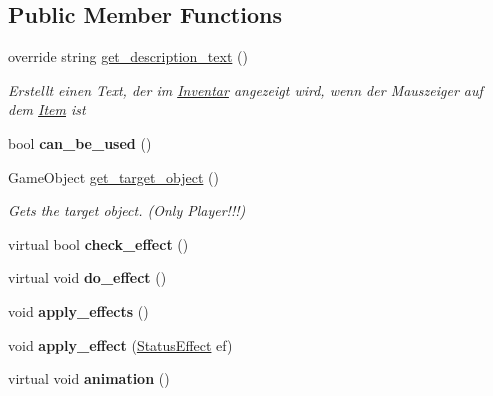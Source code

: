 \subsection*{Public Member Functions}
\begin{DoxyCompactItemize}
\item 
override string \hyperlink{class_spaceship_module_a787019cbebc400d17dc7233ca315c6da}{get\+\_\+description\+\_\+text} ()
\begin{DoxyCompactList}\small\item\em Erstellt einen Text, der im \hyperlink{class_inventar}{Inventar} angezeigt wird, wenn der Mauszeiger auf dem \hyperlink{class_item}{Item} ist \end{DoxyCompactList}\item 
\mbox{\label{class_spaceship_module_ad6c93bf37263a8e1c52bca757505b692}} 
bool {\bfseries can\+\_\+be\+\_\+used} ()
\item 
Game\+Object \hyperlink{class_spaceship_module_a49cfd4d32ed594c4aa7f123d2828f857}{get\+\_\+target\+\_\+object} ()
\begin{DoxyCompactList}\small\item\em Gets the target object. (Only Player!!!) \end{DoxyCompactList}\item 
\mbox{\label{class_spaceship_module_a0c5e093127af23cd68607eab7aa79de4}} 
virtual bool {\bfseries check\+\_\+effect} ()
\item 
\mbox{\label{class_spaceship_module_a93a9cd38c241da4081711ff8e627969d}} 
virtual void {\bfseries do\+\_\+effect} ()
\item 
\mbox{\label{class_spaceship_module_a4dee5c6e7f09df77ab9507f83660e88e}} 
void {\bfseries apply\+\_\+effects} ()
\item 
\mbox{\label{class_spaceship_module_ada592d0f49fb92822905aef8dc370820}} 
void {\bfseries apply\+\_\+effect} (\hyperlink{class_status_effect}{Status\+Effect} ef)
\item 
\mbox{\label{class_spaceship_module_a752dd8a75e7b2a7aa1336222837a1a49}} 
virtual void {\bfseries animation} ()
\end{DoxyCompactItemize}
